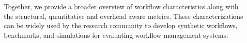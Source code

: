 Together, we provide a broader overview of workflow characteristics along with the structural, quantitative and overhead aware metrics. These characterizations can be widely used by the research community to develop synthetic workflows, benchmarks, and simulations for evaluating workflow management systems. 







